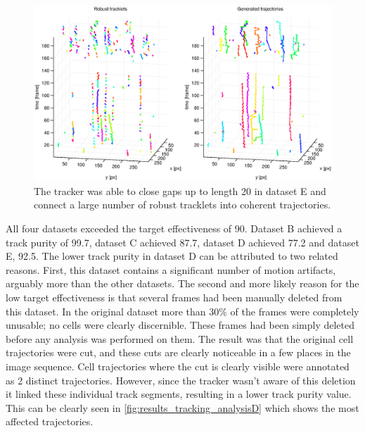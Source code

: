 		\begin{figure}[h]
			\centering
			\includegraphics[width=\textwidth]{images/fig_results_tracking_analysis5}
			\caption{The tracker was able to close gaps up to length 20 in dataset E and connect a large number of robust tracklets into coherent trajectories.}
			\label{fig:results_tracking_analysisE}
		\end{figure}

		All four datasets exceeded the target effectiveness of 90. Dataset B achieved a track purity of 99.7, dataset C achieved 87.7, dataset D achieved 77.2 and dataset E, 92.5. The lower track purity in dataset D can be attributed to two related reasons. First, this dataset contains a significant number of motion artifacts, arguably more than the other datasets. The second and more likely reason for the low target effectiveness is that several frames had been manually deleted from this dataset. In the original dataset more than 30\% of the frames were completely unusable; no cells were clearly discernible. These frames had been simply deleted before any analysis was performed on them. The result was that the original cell trajectories were cut, and these cuts are clearly noticeable in a few places in the image sequence. Cell trajectories where the cut is clearly visible were annotated as 2 distinct trajectories. However, since the tracker wasn't aware of this deletion it linked these individual track segments, resulting in a lower track purity value. This can be clearly seen in \cref{fig:results_tracking_analysisD} which shows the most affected trajectories.
		
